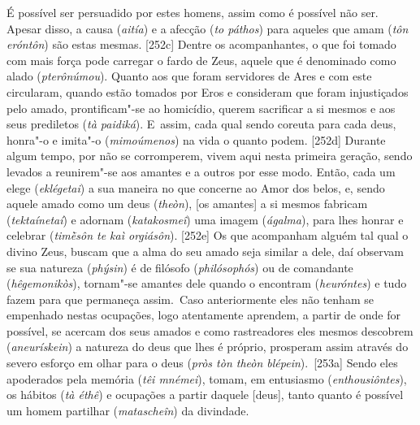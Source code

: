 É possível ser persuadido por estes homens, assim como é possível não
ser. Apesar disso, a causa (\emph{aitía}) e a afecção (\emph{to páthos})
para aqueles que amam (\emph{tôn eróntôn}) são estas mesmas. [252c]
Dentre os acompanhantes, o que foi tomado com mais força pode carregar o
fardo de Zeus, aquele que é denominado como alado (\emph{pterônúmou}).
Quanto aos que foram servidores de Ares e com este circularam, quando
estão tomados por Eros e consideram que foram injustiçados pelo amado,
prontificam"-se ao homicídio, querem sacrificar a si mesmos e aos seus
prediletos (\emph{tà paidiká}). E~assim, cada qual sendo coreuta para
cada deus, honra"-o e imita"-o (\emph{mimoúmenos}) na vida o quanto podem.
[252d] Durante algum tempo, por não se corromperem, vivem aqui nesta
primeira geração, sendo levados a reunirem"-se aos amantes e a outros por
esse modo. Então, cada um elege (\emph{eklégetai}) a sua maneira no que
concerne ao Amor dos belos, e, sendo aquele amado como um deus
(\emph{theòn}), [os amantes] a si mesmos fabricam
(\emph{tektaínetaí}) e adornam (\emph{katakosmeî}) uma imagem
(\emph{ágalma}), para lhes honrar e celebrar (\emph{timḕsôn te kaì
orgiásôn}). [252e] Os que acompanham alguém tal qual o divino Zeus,
buscam que a alma do seu amado seja similar a dele, daí observam se sua
natureza (\emph{phýsin}) é de filósofo (\emph{philósophós}) ou de
comandante (\emph{hêgemonikòs}), tornam"-se amantes dele quando o
encontram (\emph{heuróntes}) e tudo fazem para que permaneça assim.~Caso
anteriormente eles não tenham se empenhado nestas ocupações, logo
atentamente aprendem, a partir de onde for possível, se acercam dos seus
amados e como rastreadores eles mesmos descobrem (\emph{aneurískein}) a
natureza do deus que lhes é próprio, prosperam assim através do severo
esforço em olhar para o deus (\emph{pròs tòn theòn blépein}).~[253a]
Sendo eles apoderados pela memória (\emph{têi mnémei}), tomam, em
entusiasmo (\emph{enthousiôntes}), os hábitos (\emph{tà éthê}) e
ocupações a partir daquele [deus], tanto quanto é possível um homem
partilhar (\emph{matascheîn}) da divindade.

